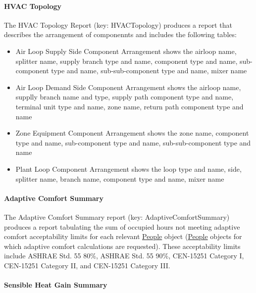 \paragraph{HVAC Topology}\label{hvac-topology}

The HVAC Topology Report (key: HVACTopology) produces a report that describes the arrangement of componennts and includes the following tables:

\begin{itemize}
\item
  Air Loop Supply Side Component Arrangement shows the airloop name, splitter name, supply branch type and name, component type and name, sub-component type and name, sub-sub-component type and name, mixer name
\item
  Air Loop Demand Side Component Arrangement shows the airloop name, supplly branch name and type, supply path component type and name, terminal unit type and name, zone name, return path component type and name
\item
  Zone Equipment Component Arrangement shows the zone name, component type and name, sub-component type and name, sub-sub-component type and name
\item
  Plant Loop Component Arrangement shows the loop type and name, side, splitter name, branch name, component type and name, mixer name
\end{itemize}


\paragraph{Adaptive Comfort Summary}\label{adaptive-comfort-summary}

The Adaptive Comfort Summary report (key: AdaptiveComfortSummary) produces a report tabulating the sum of occupied hours not meeting adaptive comfort acceptability limits for each relevant \hyperref[people]{People} object (\hyperref[people]{People} objects for which adaptive comfort calculations are requested). These acceptability limits include ASHRAE Std. 55 80\%, ASHRAE Std. 55 90\%, CEN-15251 Category I, CEN-15251 Category II, and CEN-15251 Category III.

\paragraph{Sensible Heat Gain Summary}\label{sensible-heat-gain-summary}

